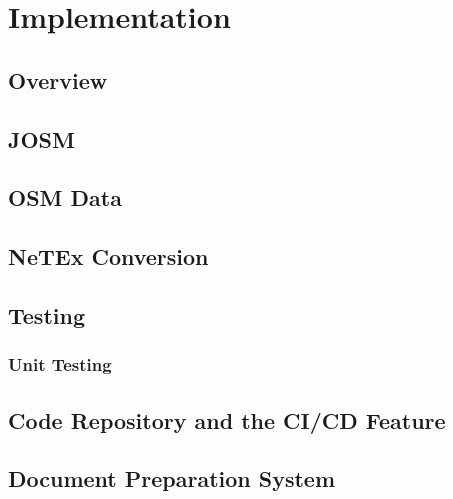 \chapter{Implementation}
\section{Overview}
\lipsum[4-5]

\section{JOSM}
\lipsum[4-6]

\section{OSM Data}
\lipsum[7-9]

\section{NeTEx Conversion}
\lipsum[10-13]

\section{Testing}
\lipsum[7-8]
\subsection{Unit Testing}
\lipsum[5-6]
\newpage
\section{Code Repository and the CI/CD Feature}
\label{sec:GitLab}
\lipsum[7-8]	
\section{Document Preparation System}
\lipsum[10-11]
